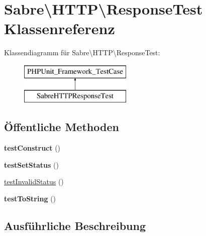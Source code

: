 \hypertarget{class_sabre_1_1_h_t_t_p_1_1_response_test}{}\section{Sabre\textbackslash{}H\+T\+TP\textbackslash{}Response\+Test Klassenreferenz}
\label{class_sabre_1_1_h_t_t_p_1_1_response_test}
Klassendiagramm für Sabre\textbackslash{}H\+T\+TP\textbackslash{}Response\+Test\+:\begin{figure}[H]
\begin{center}
\leavevmode
\includegraphics[height=2.000000cm]{class_sabre_1_1_h_t_t_p_1_1_response_test}
\end{center}
\end{figure}
\subsection*{Öffentliche Methoden}
\begin{DoxyCompactItemize}
\item 
\mbox{\label{class_sabre_1_1_h_t_t_p_1_1_response_test_a7212eec12e5d12ccccdc16fdab1caada}} 
{\bfseries test\+Construct} ()
\item 
\mbox{\label{class_sabre_1_1_h_t_t_p_1_1_response_test_a7645db42b522c21ea053b9c4024c2fab}} 
{\bfseries test\+Set\+Status} ()
\item 
\mbox{\hyperlink{class_sabre_1_1_h_t_t_p_1_1_response_test_a4c026a1e343d029b72527bedc92b830b}{test\+Invalid\+Status}} ()
\item 
\mbox{\label{class_sabre_1_1_h_t_t_p_1_1_response_test_a62732d5a588780a537b65dd286e16700}} 
{\bfseries test\+To\+String} ()
\end{DoxyCompactItemize}


\subsection{Ausführliche Beschreibung}


